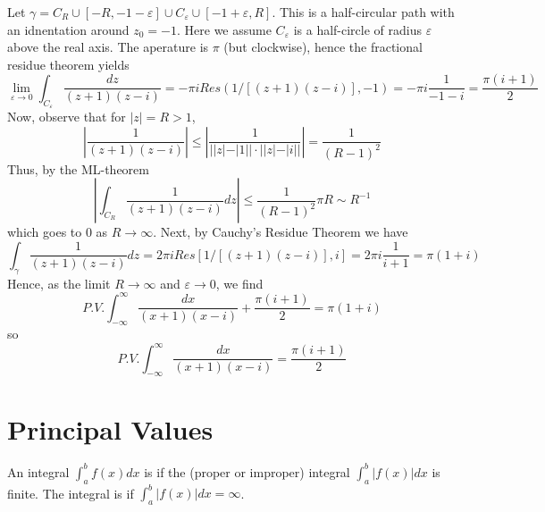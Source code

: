 \documentclass[12pt, a4paper, oneside, openright, titlepage]{book}
\begin{document}
\begin{eg}
    Let $\gamma = C_R\cup[-R,-1-\varepsilon]\cup C_{\varepsilon}\cup[-1+\varepsilon,R]$. This is a half-circular path with an idnentation around $z_0 = -1$. Here we assume $C_{\varepsilon}$ is a half-circle of radius $\varepsilon$ above the real axis. The aperature is $\pi$ (but clockwise), hence the fractional residue theorem yields \begin{equation*}
        \lim\limits_{\varepsilon\rightarrow 0}\int_{C_{\varepsilon}}\frac{dz}{(z+1)(z-i)} = -\pi iRes(1/[(z+1)(z-i)],-1) = -\pi i\frac{1}{-1-i} = \frac{\pi (i+1)}{2}
    \end{equation*}
    Now, observe that for $|z| = R > 1$, $$\left|\frac{1}{(z+1)(z-i)}\right| \leq \left|\frac{1}{||z|-|1||\cdot||z|-|i||}\right| = \frac{1}{(R-1)^2}$$
    Thus, by the ML-theorem \begin{equation*}
        \left|\int_{C_R}\frac{1}{(z+1)(z-i)}dz\right| \leq \frac{1}{(R-1)^2}\pi R \sim R^{-1}
    \end{equation*}
    which goes to $0$ as $R\rightarrow \infty$. Next, by Cauchy's Residue Theorem we have \begin{equation*}
        \int_{\gamma}\frac{1}{(z+1)(z-i)}dz = 2\pi iRes[1/[(z+1)(z-i)],i] = 2\pi i\frac{1}{i+1} = \pi(1+i)
    \end{equation*}
    Hence, as the limit $R\rightarrow \infty$ and $\varepsilon \rightarrow 0$, we find \begin{equation*}
        P.V.\int_{-\infty}^{\infty}\frac{dx}{(x+1)(x-i)} + \frac{\pi (i+1)}{2} = \pi(1+i)
    \end{equation*}
    so \begin{equation*}
        P.V.\int_{-\infty}^{\infty}\frac{dx}{(x+1)(x-i)} = \frac{\pi(i+1)}{2}
    \end{equation*}
\end{eg}



\section{Principal Values}

\begin{defn}
    An integral $\int_a^bf(x)dx$ is  if the (proper or improper) integral $\int_a^b|f(x)|dx$ is finite. The integral is  if $\int_a^b|f(x)|dx = \infty$.
\end{defn}
\end{document}

